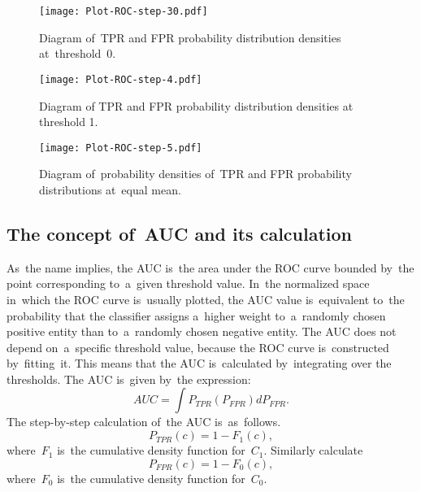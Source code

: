 \documentclass[]{scrreprt}
\begin{document}
%
\begin{figure}[ht]
	\centering
	\texttt{[image: Plot-ROC-step-30.pdf]}
	\caption{Diagram of~TPR and FPR probability distribution densities at~threshold~0.}
	\label{fig:plot-TPR-FPR-prob-density-3}
\end{figure}
%
\begin{figure}[ht]
	\centering
	\texttt{[image: Plot-ROC-step-4.pdf]}
	\caption{Diagram of TPR and FPR probability distribution densities at threshold 1.}
	\label{fig:plot-TPR-FPR-prob-density-4}
\end{figure}
%
\begin{figure}[ht]
	\centering
	\texttt{[image: Plot-ROC-step-5.pdf]}
	\caption{Diagram of~probability densities of~TPR and FPR probability distributions at~equal mean.}
	\label{fig:plot-TPR-FPR-prob-density-5}
\end{figure}
%
\subsection{The concept of~AUC and its calculation}
As~the name implies, the AUC is~the area under the ROC curve bounded by~the point corresponding to~a~given threshold value. In~the normalized space in~which the ROC curve is~usually plotted, the AUC value is~equivalent to~the probability that the classifier assigns a~higher weight to~a~randomly chosen positive entity than to~a~randomly chosen negative entity. The AUC does not depend on~a~specific threshold value, because the ROC curve is~constructed by~fitting~it. This means that the AUC is~calculated by~integrating over the thresholds. The AUC is~given by~the expression:
\begin{equation}\label{eq:AUC-computation-0}
AUC = \int P_{TPR}(P_{FPR}) d P_{FPR}.
\end{equation}
The step-by-step calculation of~the AUC is~as~follows.
\begin{equation}\label{eq:AUC-computation-1}
P_{TPR}(c) = 1 - F_{1}(c),
\end{equation}
where~$F_{1}$ is~the cumulative density function for~$C_{1}$. Similarly calculate
\begin{equation}\label{eq:AUC-computation-2}
P_{FPR}(c) = 1 - F_{0}(c),
\end{equation}
where~$F_{0}$ is~the cumulative density function for~$C_{0}$.
\end{document}
